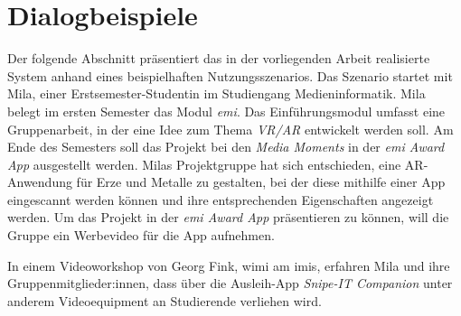 \chapter{Dialogbeispiele}
\label{chapter-dialogbeispiel}
Der folgende Abschnitt präsentiert das in der vorliegenden Arbeit realisierte
System anhand eines beispielhaften Nutzungsszenarios. Das Szenario startet mit
Mila, einer Erstsemester-Studentin im Studiengang Medieninformatik. Mila belegt
im ersten Semester das Modul \textit{\ac{emi}}. Das Einführungsmodul umfasst
eine Gruppenarbeit, in der eine Idee zum Thema \textit{VR/AR} entwickelt werden
soll. Am Ende des Semesters soll das Projekt bei den \textit{Media Moments} in
der \textit{\ac{emi} Award App} \cite{UniversitatzuLubeck2021} ausgestellt werden.
Milas Projektgruppe hat sich entschieden, eine AR-Anwendung für Erze und Metalle
zu gestalten, bei der diese mithilfe einer App eingescannt werden
können und ihre entsprechenden Eigenschaften angezeigt werden. Um das Projekt in
der \textit{\ac{emi} Award App} präsentieren zu können, will die Gruppe ein
Werbevideo für die App aufnehmen.

In einem Videoworkshop von Georg Fink, \ac{wimi} am \ac{imis}, erfahren
Mila und ihre Gruppenmitglieder:innen, dass über die Ausleih-App
\textit{Snipe-IT Companion} unter anderem Videoequipment an Studierende
verliehen wird.


